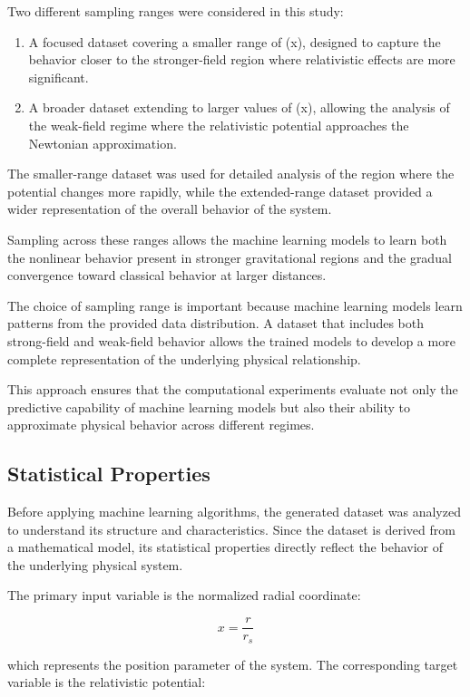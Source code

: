 \documentclass[
]{article}
\begin{document}
Two different sampling ranges were considered in this study:

\begin{enumerate}
\def\labelenumi{\arabic{enumi}.}
\item
  A focused dataset covering a smaller range of (x), designed to capture
  the behavior closer to the stronger-field region where relativistic
  effects are more significant.
\item
  A broader dataset extending to larger values of (x), allowing the
  analysis of the weak-field regime where the relativistic potential
  approaches the Newtonian approximation.
\end{enumerate}

The smaller-range dataset was used for detailed analysis of the region
where the potential changes more rapidly, while the extended-range
dataset provided a wider representation of the overall behavior of the
system.

Sampling across these ranges allows the machine learning models to learn
both the nonlinear behavior present in stronger gravitational regions
and the gradual convergence toward classical behavior at larger
distances.

The choice of sampling range is important because machine learning
models learn patterns from the provided data distribution. A dataset
that includes both strong-field and weak-field behavior allows the
trained models to develop a more complete representation of the
underlying physical relationship.

This approach ensures that the computational experiments evaluate not
only the predictive capability of machine learning models but also their
ability to approximate physical behavior across different regimes.

\subsection{Statistical Properties}\label{statistical-properties}

Before applying machine learning algorithms, the generated dataset was
analyzed to understand its structure and characteristics. Since the
dataset is derived from a mathematical model, its statistical properties
directly reflect the behavior of the underlying physical system.

The primary input variable is the normalized radial coordinate:

\[
x=\frac{r}{r_s}
\]

which represents the position parameter of the system. The corresponding
target variable is the relativistic potential:
\end{document}
